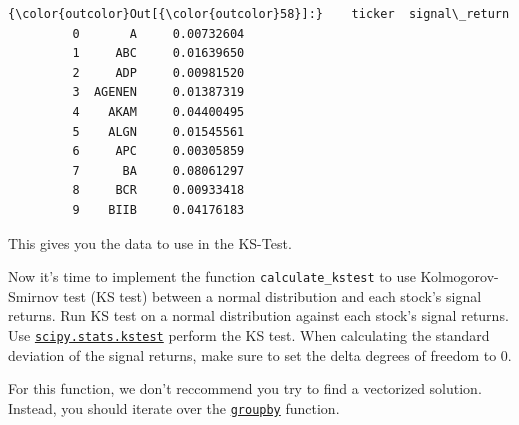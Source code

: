 \documentclass[11pt]{article}
\begin{document}
\begin{Verbatim}[commandchars=\\\{\}]
{\color{outcolor}Out[{\color{outcolor}58}]:}    ticker  signal\_return
         0       A     0.00732604
         1     ABC     0.01639650
         2     ADP     0.00981520
         3  AGENEN     0.01387319
         4    AKAM     0.04400495
         5    ALGN     0.01545561
         6     APC     0.00305859
         7      BA     0.08061297
         8     BCR     0.00933418
         9    BIIB     0.04176183
\end{Verbatim}
            
    This gives you the data to use in the KS-Test.

Now it's time to implement the function \texttt{calculate\_kstest} to
use Kolmogorov-Smirnov test (KS test) between a normal distribution and
each stock's signal returns. Run KS test on a normal distribution
against each stock's signal returns. Use
\href{https://docs.scipy.org/doc/scipy-0.14.0/reference/generated/scipy.stats.kstest.html\#scipy-stats-kstest}{\texttt{scipy.stats.kstest}}
perform the KS test. When calculating the standard deviation of the
signal returns, make sure to set the delta degrees of freedom to 0.

For this function, we don't reccommend you try to find a vectorized
solution. Instead, you should iterate over the
\href{https://pandas.pydata.org/pandas-docs/version/0.21/generated/pandas.DataFrame.groupby.html}{\texttt{groupby}}
function.
\end{document}
